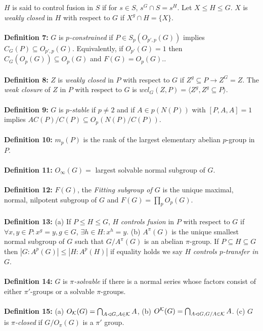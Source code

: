 $H$ is said to
control fusion in $S$ if for $s \in S$, $s^G \cap S = s^H$.
Let $X \le H \le G$.  $X$ is \emph{weakly closed} in $H$ with respect to $G$ if
$X^g \cap H = \{X\}$.\\
\\
{\bf Definition 7:}
$G$ is $p$\emph{-constrained} if
$P \in S_p ( O_{p',p} (G))$ implies $C_G(P) \subseteq O_{p',p} (G)$.
Equivalently, if $O_{p'}(G)=1$ then $C_G(O_p(G)) \subseteq O_p(G)$ and $F(G)= O_p(G)$..
\\
\\
{\bf Definition 8:}
$Z$ is \emph {weakly closed} in $P$ with respect to $G$ if $Z^g \subseteq P \rightarrow Z^G=Z$.
The \emph {weak closure} of $Z$ in $P$ with respect to $G$ is $wcl_G(Z, P)=
\langle Z^g, Z^g \subseteq P \rangle $.
\\
\\
{\bf Definition 9:}
$G$ is $p$\emph{-stable} if $p \ne 2$ and
if $A \in p(N(P))$ with $[P,A,A]= 1$ implies $A C(P)/C(P) \subseteq O_p (N(P)/C(P))$.
\\
\\
{\bf Definition 10:}
$m_p(P)$ is the rank of the largest elementary abelian $p$-group in $P$.
\\
\\
{\bf Definition 11:}
$O_{\infty}(G)=$ largest solvable normal subgroup of $G$.
\\
\\
{\bf Definition 12:} $F(G)$, the \emph{Fitting subgroup of $G$}
is the unique maximal, normal, nilpotent subgroup of $G$ and
$F(G)= \prod_p O_p(G)$.
\\
\\
{\bf Definition 13:} (a) If $P \leq H \leq G$, $H$ \emph{controls fusion} in $P$ with respect to
$G$ if $\forall x, y \in P: x^g=y, g \in G$, $\exists h \in H: x^h=y$.
(b) $A^{\pi}(G)$ is the unique smallest normal subgroup of $G$ such that
$G/A^{\pi}(G)$ is an abelian $\pi$-group.  If $P \subseteq H \subseteq G$ then
$ |G:A^p(G)| \le |H:A^p(H)|$ if equality holds we say $H$ \emph {controls $p$-transfer in $G$}.
\\
\\
{\bf Definition 14:}
$G$  is
$\pi$\emph{-solvable} if there is a normal series whose factors
consist of either $\pi'$-groups or a solvable
$\pi$-groups.
\\
\\
{\bf Definition 15:} 
(a) $O_{\cal K}(G) = \bigcap_{A \lhd G, A \in {\cal K}} A$,
(b) $O^{\cal K}(G)= \bigcap_{A \lhd G, G/A \in {\cal K}} A$.
(c) $G$ is $\pi$\emph{-closed} if $G/O_{\pi}(G)$ is a $\pi'$ group.
